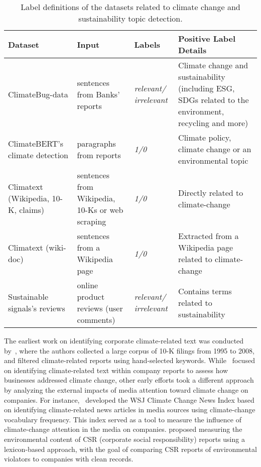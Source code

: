 \begin{table}[ht]
\centering
\begin{tabular}{p{3cm}p{4cm}p{1.3cm}p{5cm}}
\toprule
\textbf{Dataset} & \textbf{Input} & \textbf{Labels} & \textbf{Positive Label Details}  \\ \midrule
ClimateBug-data \cite{yu_climatebug_2024} & sentences from Banks' reports  & \textit{relevant/} \textit{irrelevant} & Climate change and sustainability (including ESG, SDGs related to the environment, recycling and more) \\ \midrule
ClimateBERT's climate detection \cite{bingler2023cheaptalkspecificitysentiment} & paragraphs from reports & \textit{1/0} & Climate policy, climate change or an environmental topic \\ \midrule
Climatext (Wikipedia, 10-K, claims) \cite{varini_climatext_2020} & sentences from Wikipedia, 10-Ks or web scraping & \textit{1/0} & Directly related to climate-change \\ \midrule
Climatext (wiki-doc) \cite{varini_climatext_2020} & sentences from a Wikipedia page & \textit{1/0} & Extracted from a Wikipedia page related to climate-change \\ \midrule
Sustainable signals's reviews \cite{linSUSTAINABLESIGNALSijcai2023} & online product reviews (user comments) & \textit{relevant/} \textit{irrelevant} & Contains terms related to sustainability  \\ \bottomrule
\end{tabular}
\caption{Label definitions of the datasets related to climate change and sustainability topic detection.}
\label{tab:guidelines climate-related}
\end{table}

\zeroshot The earliest work on identifying corporate climate-related text was conducted by~\citet{doran_risk_disclosure}, where the authors collected a large corpus of 10-K filings from 1995 to 2008, and filtered climate-related reports using hand-selected keywords. While~\citet{doran_risk_disclosure} focused on identifying climate-related text within company reports to assess how businesses addressed climate change, other early efforts took a different approach by analyzing the external impacts of media attention toward climate change on companies. For instance,~\citet{Engle_hedging_climatechange} developed the WSJ Climate Change News Index based on identifying climate-related news articles in media sources using climate-change vocabulary frequency. This index served as a tool to measure the influence of climate-change attention in the media on companies. \citet{csr_report_greenwashing} proposed measuring the environmental content of CSR (corporate social responsibility) reports using a lexicon-based approach, with the goal of comparing CSR reports of environmental violators to companies with clean records. 



